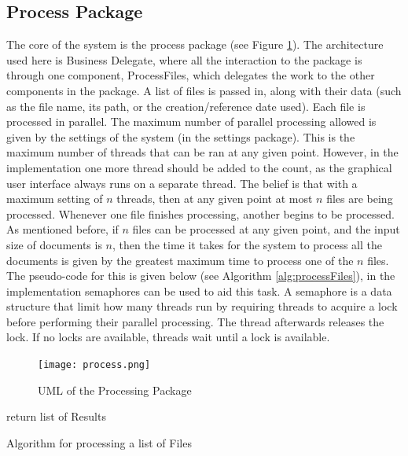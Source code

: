 \subsection{Process Package}
\par The core of the system is the process package (see Figure \ref{fig:process}). The architecture used here is Business Delegate, where all the interaction to the package is through one component, ProcessFiles, which delegates the work to the other components in the package. A list of files is passed in, along with their data (such as the file name, its path, or the creation/reference date used). Each file is processed in parallel. The maximum number of parallel processing allowed is given by the settings of the system (in the settings package). This is the maximum number of threads that can be ran at any given point. However, in the implementation one more thread should be added to the count, as the graphical user interface always runs on a separate thread. The belief is that with a maximum setting of $n$ threads, then at any given point at most $n$ files are being processed. Whenever one file finishes processing, another begins to be processed. As mentioned before, if $n$ files can be processed at any given point, and the input size of documents is $n$, then the time it takes for the system to process all the documents is given by the greatest maximum time to process one of the $n$ files. The pseudo-code for this is given below (see Algorithm \ref{alg:processFiles}), in the implementation semaphores can be used to aid this task. A semaphore is a data structure that limit how many threads run by requiring threads to acquire a lock before performing their parallel processing. The thread afterwards releases the lock. If no locks are available, threads wait until a lock is available.
\begin{figure}[H]
\caption{UML of the Processing Package}
\label{fig:process}
\texttt{[image: process.png]}
\centering
\end{figure}
\begin{algorithm}[H]
return list of Results\;
\caption{Algorithm for processing a list of Files}
\label{alg:processFiles}
\end{algorithm}
